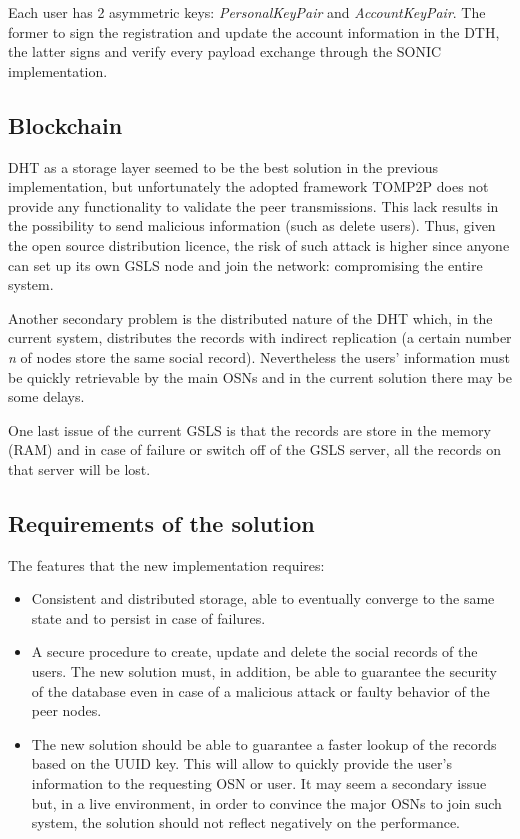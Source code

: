 Each user has 2 asymmetric keys: \textit{PersonalKeyPair} and \textit{AccountKeyPair}. The former to sign the registration and update the account information in the DTH, the latter signs and verify every payload exchange through the SONIC implementation.

\subsection{Blockchain}

DHT as a storage layer seemed to be the best solution in the previous implementation, but unfortunately the adopted framework TOMP2P \cite{tomp2p:2017} does not provide any functionality to validate the peer transmissions. 
This lack results in the possibility to send malicious information (such as delete users).
Thus, given the open source distribution licence, the risk of such attack is higher since anyone can set up its own GSLS node and join the network: compromising the entire system. \par

Another secondary problem is the distributed nature of the DHT which, in the current system, distributes the records with indirect replication \cite{_tomp2p_2017} (a certain number \textit{n} of nodes store the same social record). Nevertheless the users' information must be quickly retrievable by the main OSNs and in the current solution there may be some delays. \par

One last issue of the current GSLS is that the records are store in the memory (RAM) and in case of failure or switch off of the GSLS server, all the records on that server will be lost. \par

\subsection{Requirements of the solution}
The features that the new implementation requires:
\begin{itemize}
  \item Consistent and distributed storage, able to eventually converge to the same state and to persist in case of failures.
  \item A secure procedure to create, update and delete the social records of the users. The new solution must, in addition, be able to guarantee the security of the database even in case of a malicious attack or faulty behavior of the peer nodes.
  \item The new solution should be able to guarantee a faster lookup of the records based on the UUID key. This will allow to quickly provide the user's information to the requesting OSN or user. It may seem a secondary issue but, in a live environment, in order to convince the major OSNs to join such system, the solution should not reflect negatively on the performance.
\end{itemize}

